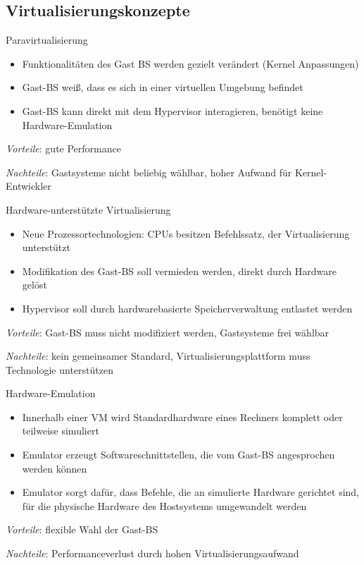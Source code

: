 \subsection{Virtualisierungskonzepte}

\begin{defi}{Paravirtualisierung}
    \begin{itemize}
        \item Funktionalitäten des Gast BS werden gezielt verändert (Kernel Anpassungen)
        \item Gast-BS \glqq weiß\grqq, dass es sich in einer virtuellen Umgebung befindet
        \item Gast-BS kann direkt mit dem Hypervisor interagieren, benötigt keine Hardware-Emulation
    \end{itemize}

    \emph{Vorteile}: gute Performance

    \emph{Nachteile}: Gastsysteme nicht beliebig wählbar, hoher Aufwand für Kernel-Entwickler
\end{defi}

\begin{defi}{Hardware-unterstützte Virtualisierung}
    \begin{itemize}
        \item Neue Prozessortechnologien: CPUs besitzen Befehlssatz, der Virtualisierung unterstützt
        \item Modifikation des Gast-BS soll vermieden werden, direkt durch Hardware gelöst
        \item Hypervisor soll durch hardwarebasierte Speicherverwaltung entlastet werden
    \end{itemize}

    \emph{Vorteile}: Gast-BS muss nicht modifiziert werden, Gastsysteme frei wählbar

    \emph{Nachteile}: kein gemeinsamer Standard, Virtualisierungsplattform muss Technologie unterstützen
\end{defi}

\begin{defi}{Hardware-Emulation}
    \begin{itemize}
        \item Innerhalb einer VM wird Standardhardware eines Rechners komplett oder teilweise simuliert
        \item Emulator erzeugt Softwareschnittstellen, die vom Gast-BS angesprochen werden können
        \item Emulator sorgt dafür, dass Befehle, die an simulierte Hardware gerichtet sind, für die physische Hardware des Hostsystems umgewandelt werden
    \end{itemize}

    \emph{Vorteile}: flexible Wahl der Gast-BS

    \emph{Nachteile}: Performanceverlust durch hohen Virtualisierungsaufwand
\end{defi}

